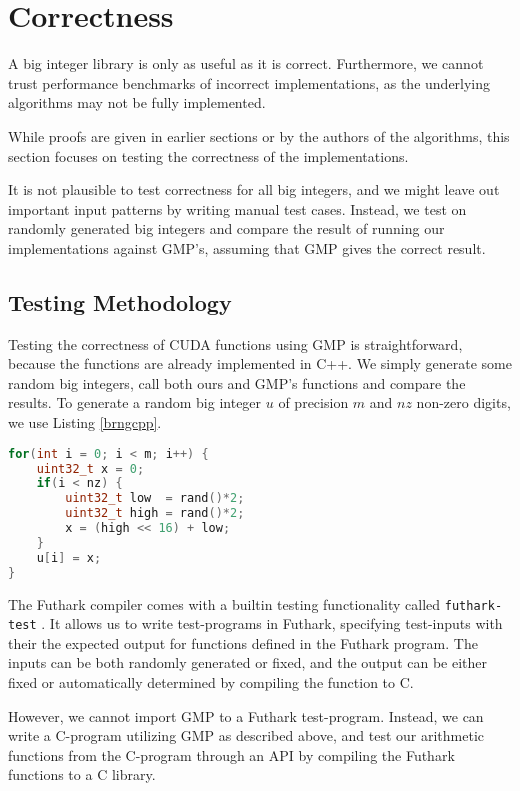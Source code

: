 \section{Correctness}
\label{sec:cor}

A big integer library is only as useful as it is correct. Furthermore, we cannot
trust performance benchmarks of incorrect implementations, as the underlying
algorithms may not be fully implemented.

While proofs are given in earlier sections or by the authors of the algorithms,
this section focuses on testing the correctness of the implementations.

It is not plausible to test correctness for all big integers, and we might leave
out important input patterns by writing manual test cases. Instead, we test on
randomly generated big integers and compare the result of running our
implementations against GMP's, assuming that GMP gives the correct result.

\subsection{Testing Methodology}

Testing the correctness of CUDA functions using GMP is straightforward, because
the functions are already implemented in C++. We simply generate some random big
integers, call both ours and GMP's functions and compare the results. To
generate a random big integer $u$ of precision $m$ and $\mathit{nz}$ non-zero
digits, we use Listing \ref{brngcpp}.

\begin{lstlisting}[language=CPP, caption={\footnotesize Random big integer generator in C++.}, label={brngcpp}]
for(int i = 0; i < m; i++) {
    uint32_t x = 0;
    if(i < nz) {
        uint32_t low  = rand()*2;
        uint32_t high = rand()*2;
        x = (high << 16) + low;
    }
    u[i] = x;
}
\end{lstlisting}

The Futhark compiler comes with a builtin testing functionality called
\texttt{futhark-test} \cite{futguide}. It allows us to write test-programs in
Futhark, specifying test-inputs with their the expected output for functions
defined in the Futhark program. The inputs can be both randomly generated or
fixed, and the output can be either fixed or automatically determined by
compiling the function to C.

However, we cannot import GMP to a Futhark test-program. Instead, we can write a
C-program utilizing GMP as described above, and test our arithmetic functions
from the C-program through an API by compiling the Futhark functions to a C
library.

